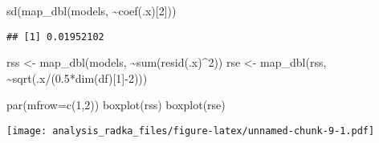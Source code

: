 \documentclass[
]{article}
\newenvironment{Shaded}{\begin{snugshade}}{\end{snugshade}}
\newcommand{\AttributeTok}[1]{\textcolor[rgb]{0.77,0.63,0.00}{#1}}
\newcommand{\DecValTok}[1]{\textcolor[rgb]{0.00,0.00,0.81}{#1}}
\newcommand{\FloatTok}[1]{\textcolor[rgb]{0.00,0.00,0.81}{#1}}
\newcommand{\FunctionTok}[1]{\textcolor[rgb]{0.00,0.00,0.00}{#1}}
\newcommand{\NormalTok}[1]{#1}
\newcommand{\OtherTok}[1]{\textcolor[rgb]{0.56,0.35,0.01}{#1}}
\newcommand{\SpecialCharTok}[1]{\textcolor[rgb]{0.00,0.00,0.00}{#1}}
\begin{document}
\begin{Shaded}
\begin{Highlighting}[]
\FunctionTok{sd}\NormalTok{(}\FunctionTok{map\_dbl}\NormalTok{(models, }\SpecialCharTok{\textasciitilde{}}\FunctionTok{coef}\NormalTok{(.x)[}\DecValTok{2}\NormalTok{]))}
\end{Highlighting}
\end{Shaded}

\begin{verbatim}
## [1] 0.01952102
\end{verbatim}

\begin{Shaded}
\begin{Highlighting}[]
\NormalTok{rss }\OtherTok{\textless{}{-}} \FunctionTok{map\_dbl}\NormalTok{(models, }\SpecialCharTok{\textasciitilde{}}\FunctionTok{sum}\NormalTok{(}\FunctionTok{resid}\NormalTok{(.x)}\SpecialCharTok{\^{}}\DecValTok{2}\NormalTok{))}
\NormalTok{rse }\OtherTok{\textless{}{-}} \FunctionTok{map\_dbl}\NormalTok{(rss, }\SpecialCharTok{\textasciitilde{}}\FunctionTok{sqrt}\NormalTok{(.x}\SpecialCharTok{/}\NormalTok{(}\FloatTok{0.5}\SpecialCharTok{*}\FunctionTok{dim}\NormalTok{(df)[}\DecValTok{1}\NormalTok{]}\SpecialCharTok{{-}}\DecValTok{2}\NormalTok{)))}

\FunctionTok{par}\NormalTok{(}\AttributeTok{mfrow=}\FunctionTok{c}\NormalTok{(}\DecValTok{1}\NormalTok{,}\DecValTok{2}\NormalTok{)) }
\FunctionTok{boxplot}\NormalTok{(rss)}
\FunctionTok{boxplot}\NormalTok{(rse)}
\end{Highlighting}
\end{Shaded}

\texttt{[image: analysis\_radka\_files/figure-latex/unnamed-chunk-9-1.pdf]}
\end{document}
